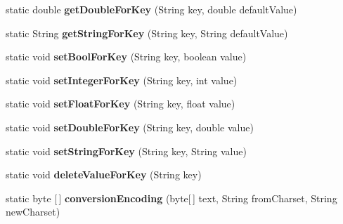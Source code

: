 \begin{DoxyCompactItemize}
static double {\bfseries get\+Double\+For\+Key} (String key, double default\+Value)
\item 
\mbox{\label{classorg_1_1cocos2dx_1_1lib_1_1Cocos2dxHelper_a6b061fe180735045ee2c594b8f41c936}} 
static String {\bfseries get\+String\+For\+Key} (String key, String default\+Value)
\item 
\mbox{\label{classorg_1_1cocos2dx_1_1lib_1_1Cocos2dxHelper_a745abe7bf814fa6c12db59af579b3db9}} 
static void {\bfseries set\+Bool\+For\+Key} (String key, boolean value)
\item 
\mbox{\label{classorg_1_1cocos2dx_1_1lib_1_1Cocos2dxHelper_a6f1a16c7832115046a4953b97bc62795}} 
static void {\bfseries set\+Integer\+For\+Key} (String key, int value)
\item 
\mbox{\label{classorg_1_1cocos2dx_1_1lib_1_1Cocos2dxHelper_a5904c46db1c777b1ee9beff4cce1eb0b}} 
static void {\bfseries set\+Float\+For\+Key} (String key, float value)
\item 
\mbox{\label{classorg_1_1cocos2dx_1_1lib_1_1Cocos2dxHelper_a7e40a604bb2dba638c3ddbda4e23c531}} 
static void {\bfseries set\+Double\+For\+Key} (String key, double value)
\item 
\mbox{\label{classorg_1_1cocos2dx_1_1lib_1_1Cocos2dxHelper_a5c1620e385096aa12a6511601b15aacc}} 
static void {\bfseries set\+String\+For\+Key} (String key, String value)
\item 
\mbox{\label{classorg_1_1cocos2dx_1_1lib_1_1Cocos2dxHelper_aa887d97550b6899da98f9af0e709f65b}} 
static void {\bfseries delete\+Value\+For\+Key} (String key)
\item 
\mbox{\label{classorg_1_1cocos2dx_1_1lib_1_1Cocos2dxHelper_af27c10d215f301e71e1f8a3c329641c1}} 
static byte \mbox{[}$\,$\mbox{]} {\bfseries conversion\+Encoding} (byte\mbox{[}$\,$\mbox{]} text, String from\+Charset, String new\+Charset)

\end{DoxyCompactItemize}
